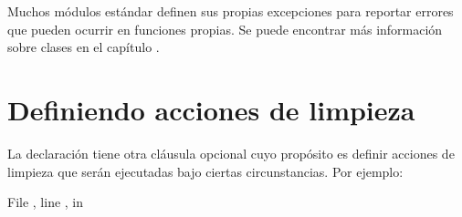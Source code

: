 \documentclass[a5paper,10pt,spanish]{sphinxmanual}
\begin{document}
\sphinxAtStartPar
Muchos módulos estándar definen sus propias excepciones para reportar errores que pueden ocurrir en funciones propias. Se puede encontrar más información sobre clases en el capítulo {\hyperref[\detokenize{tutorial/classes:tut-classes}]{}}.


\section{Definiendo acciones de limpieza}
\label{\detokenize{tutorial/errors:defining-clean-up-actions}}\label{\detokenize{tutorial/errors:tut-cleanup}}
\sphinxAtStartPar
La declaración  tiene otra cláusula opcional cuyo propósito es definir acciones de limpieza que serán ejecutadas bajo ciertas circunstancias. Por ejemplo:

\begin{sphinxVerbatim}[commandchars=\\\{\}]
     
    
  File , line , in 
\end{sphinxVerbatim}
\end{document}
